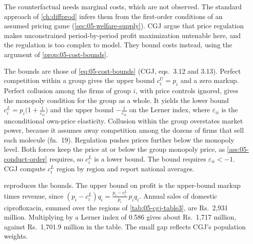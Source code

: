 The counterfactual needs marginal costs, which are not observed. The standard approach of \cref{ch:diffprod} infers
them from the first-order conditions of an assumed pricing game (\cref{sec:05-welfare-supply}). CGJ argue that price
regulation makes unconstrained period-by-period profit maximization untenable here, and the regulation is too complex
to model. They bound costs instead, using the argument of \cref{prop:05-cost-bounds}.

The bounds are those of \eqref{eq:05-cost-bounds} (CGJ, eqs.~3.12 and 3.13). Perfect competition within a group gives
the upper bound $c_i^U = p_i$ and a zero markup. Perfect collusion among the firms of group $i$, with price controls
ignored, gives the monopoly condition for the group as a whole. It yields the lower bound $c_i^L =
p_i\bigl(1 + \frac{1}{\varepsilon_{ii}}\bigr)$ and the upper bound $-\frac{1}{\varepsilon_{ii}}$ on the Lerner
index, where $\varepsilon_{ii}$ is the unconditional own-price elasticity. Collusion within the group overstates
market power, because it assumes away competition among the dozens of firms that sell each molecule (fn.~19).
Regulation pushes prices further below the monopoly level. Both forces keep the price at or below the group monopoly
price, as \cref{ass:05-conduct-order} requires, so $c_i^L$ is a lower bound. The bound requires $\varepsilon_{ii} < -1$. CGJ compute $c_i^L$ region by
region and report national averages.

 reproduces the bounds. The upper bound on profit is the upper-bound markup times revenue,
since $(p_i - c_i^L)q_i = \frac{p_i - c_i^L}{p_i}\,p_iq_i$. Annual sales of domestic ciprofloxacin, summed over the
regions of \cref{tab:05-cgj-table3}, are Rs.~2,931 million. Multiplying by a Lerner index of 0.586 gives about
Rs.~1,717 million, against Rs.~1,701.9 million in the table. The small gap reflects CGJ's population weights.

